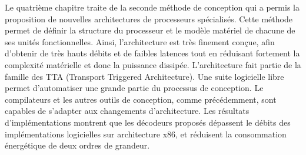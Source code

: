 Le quatrième chapitre traite de la seconde méthode de conception qui a permis la proposition de nouvelles architectures de processeurs spécialisés. Cette méthode permet de définir la structure du processeur et le modèle matériel de chacune de ses unités fonctionnelles. Ainsi, l'architecture est très finement conçue, afin d'obtenir de très hauts débits et de faibles latences tout en réduisant fortement la complexité matérielle et donc la puissance dissipée. L'architecture fait partie de la famille des TTA (Transport Triggered Architecture). Une suite logicielle libre permet d'automatiser une grande partie du processus de conception. Le compilateurs et les autres outils de conception, comme précédemment, sont capables de s'adapter aux changements d'architecture. Les résultats d'implémentations montrent que les décodeurs proposés dépassent le débits des implémentations logicielles sur architecture x86, et réduisent la consommation énergétique de deux ordres de grandeur.

\clearpage

